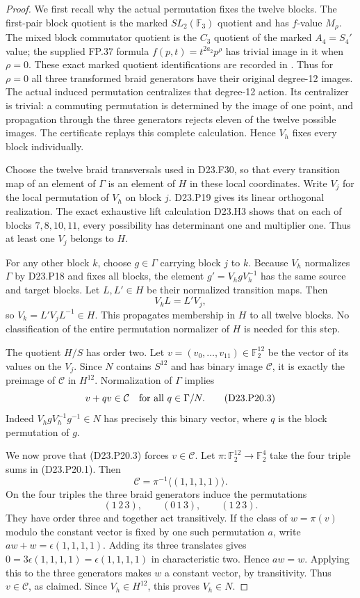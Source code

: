 \begin{proof}
We first recall why the actual permutation fixes the twelve
blocks. The first-pair block quotient is the marked
$SL_2(\mathbb F_3)$ quotient and has $f$-value $M_\rho$.
The mixed block commutator quotient is the $C_3$ quotient
of the marked $A_4=S_4'$ value; the supplied FP.37 formula
$f(p,t)=t^{2a_2}p^\rho$ has trivial image in it when
$\rho=0$. These exact marked quotient identifications are
recorded in
.
Thus for $\rho=0$ all three transformed braid generators
have their original degree-12 images. The actual induced
permutation centralizes that degree-12 action. Its
centralizer is trivial: a commuting permutation is determined
by the image of one point, and propagation through the
three generators rejects eleven of the twelve possible
images. The certificate replays this complete calculation.
Hence $V_h$ fixes every block individually.

Choose the twelve braid transversals used in D23.F30, so
that every transition map of an element of $\Gamma$ is an
element of $H$ in these local coordinates. Write $V_j$ for
the local permutation of $V_h$ on block $j$. D23.P19
gives its linear orthogonal realization. The exact exhaustive
lift calculation D23.H3 shows that on each of blocks
$7,8,10,11$, every possibility has determinant one and
multiplier one. Thus at least one $V_j$ belongs to $H$.

For any other block $k$, choose $g\in\Gamma$ carrying
block $j$ to $k$. Because $V_h$ normalizes $\Gamma$ by
D23.P18 and fixes all blocks, the element
$g'=V_hgV_h^{-1}$ has the same source and target blocks.
Let $L,L'\in H$ be their normalized transition maps. Then
\[
                         V_k L=L'V_j,
\]
so $V_k=L'V_jL^{-1}\in H$. This propagates membership in
$H$ to all twelve blocks. No classification of the entire
permutation normalizer of $H$ is needed for this step.

The quotient $H/S$ has order two. Let
$v=(v_0,\ldots,v_{11})\in\mathbb F_2^{12}$ be the vector
of its values on the $V_j$. Since $N$ contains $S^{12}$
and has binary image $\mathcal C$, it is exactly the
preimage of $\mathcal C$ in $H^{12}$. Normalization of
$\Gamma$ implies
\[
                       v+qv\in\mathcal C
                 \quad\hbox{for all }q\in\Gamma/N.       \tag{D23.P20.3}
\]
Indeed $V_hgV_h^{-1}g^{-1}\in N$ has precisely this binary
vector, where $q$ is the block permutation of $g$.

We now prove that (D23.P20.3) forces $v\in\mathcal C$.
Let $\pi:\mathbb F_2^{12}\to\mathbb F_2^4$ take the four
triple sums in (D23.P20.1). Then
\[
 \mathcal C=\pi^{-1}\langle(1,1,1,1)\rangle.
\]
On the four triples the three braid generators induce the
permutations
\[
      (1\,2\,3),\qquad(0\,1\,3),\qquad(1\,2\,3).
\]
They have order three and together act transitively. If the
class of $w=\pi(v)$ modulo the constant vector is fixed by
one such permutation $a$, write
$aw+w=\epsilon(1,1,1,1)$. Adding its three translates gives
$0=3\epsilon(1,1,1,1)=\epsilon(1,1,1,1)$ in
characteristic two. Hence $aw=w$. Applying this to the
three generators makes $w$ a constant vector, by
transitivity. Thus $v\in\mathcal C$, as claimed.
Since $V_h\in H^{12}$, this proves $V_h\in N$.


\end{proof}
